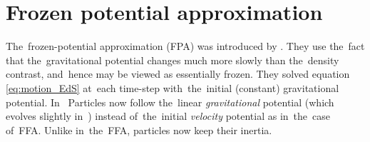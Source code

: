\section{Frozen potential approximation}
The~frozen-potential approximation (FPA) was introduced by \textcite{1994MNRAS.266..227B}. They use the~fact that the~gravitational potential changes much more slowly than the~density contrast, and~hence may be viewed as essentially frozen. They solved equation \eqref{eq:motion_EdS} at~each time-step with~the~initial (constant) gravitational potential. In~\LCDM
{}
Particles now follow the~linear \textit{gravitational} potential (which evolves slightly in~\LCDM) instead of~the~initial \textit{velocity} potential as in~the~case of~FFA. Unlike in~the~FFA, particles now keep their inertia.%

